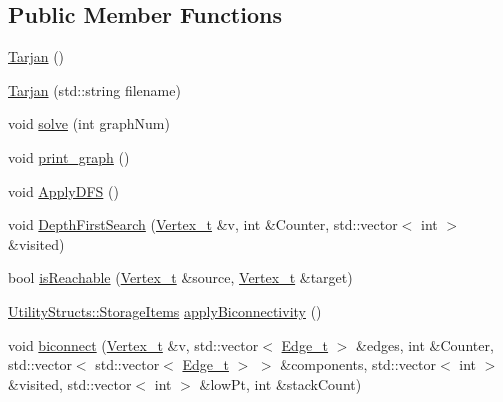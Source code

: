 \subsection*{Public Member Functions}
\begin{DoxyCompactItemize}
\item 
\hyperlink{class_tarjan_a24a7fa59ed2fcff4a520e012e30acb91_a24a7fa59ed2fcff4a520e012e30acb91}{Tarjan} ()
\item 
\hyperlink{class_tarjan_a7e9845c51e1e905df76b267370c6dc00_a7e9845c51e1e905df76b267370c6dc00}{Tarjan} (std\+::string filename)
\item 
void \hyperlink{class_tarjan_af94d48b6e78c292bd1aa465d37d89769_af94d48b6e78c292bd1aa465d37d89769}{solve} (int graph\+Num)
\item 
void \hyperlink{class_tarjan_a0ef20e22407703c87c880898c8ad5745_a0ef20e22407703c87c880898c8ad5745}{print\+\_\+graph} ()
\item 
void \hyperlink{class_tarjan_a674767d7e49ada6a738ab69187e4836d_a674767d7e49ada6a738ab69187e4836d}{Apply\+D\+FS} ()
\item 
void \hyperlink{class_tarjan_a277c58dc6f712a6ae1ef2e59c9ad58e1_a277c58dc6f712a6ae1ef2e59c9ad58e1}{Depth\+First\+Search} (\hyperlink{class_graph_component_ae67114a6ce5a001dc35e1996e1b45aa0_ae67114a6ce5a001dc35e1996e1b45aa0}{Vertex\+\_\+t} \&v, int \&Counter, std\+::vector$<$ int $>$ \&visited)
\item 
bool \hyperlink{class_tarjan_a74f69dfaa1d4cf3bac06aef7a704c0b8_a74f69dfaa1d4cf3bac06aef7a704c0b8}{is\+Reachable} (\hyperlink{class_graph_component_ae67114a6ce5a001dc35e1996e1b45aa0_ae67114a6ce5a001dc35e1996e1b45aa0}{Vertex\+\_\+t} \&source, \hyperlink{class_graph_component_ae67114a6ce5a001dc35e1996e1b45aa0_ae67114a6ce5a001dc35e1996e1b45aa0}{Vertex\+\_\+t} \&target)
\item 
\hyperlink{struct_utility_structs_1_1_storage_items}{Utility\+Structs\+::\+Storage\+Items} \hyperlink{class_tarjan_a4be3dec188e347b54a90cd5f37abc268_a4be3dec188e347b54a90cd5f37abc268}{apply\+Biconnectivity} ()
\item 
void \hyperlink{class_tarjan_a52573be5a4930ad84f3807bc49f42026_a52573be5a4930ad84f3807bc49f42026}{biconnect} (\hyperlink{class_graph_component_ae67114a6ce5a001dc35e1996e1b45aa0_ae67114a6ce5a001dc35e1996e1b45aa0}{Vertex\+\_\+t} \&v, std\+::vector$<$ \hyperlink{utilities_8h_af4a84c740ebb77e6a13a00aa289b0018_af4a84c740ebb77e6a13a00aa289b0018}{Edge\+\_\+t} $>$ \&edges, int \&Counter, std\+::vector$<$ std\+::vector$<$ \hyperlink{utilities_8h_af4a84c740ebb77e6a13a00aa289b0018_af4a84c740ebb77e6a13a00aa289b0018}{Edge\+\_\+t} $>$ $>$ \&components, std\+::vector$<$ int $>$ \&visited, std\+::vector$<$ int $>$ \&low\+Pt, int \&stack\+Count)

\end{DoxyCompactItemize}
